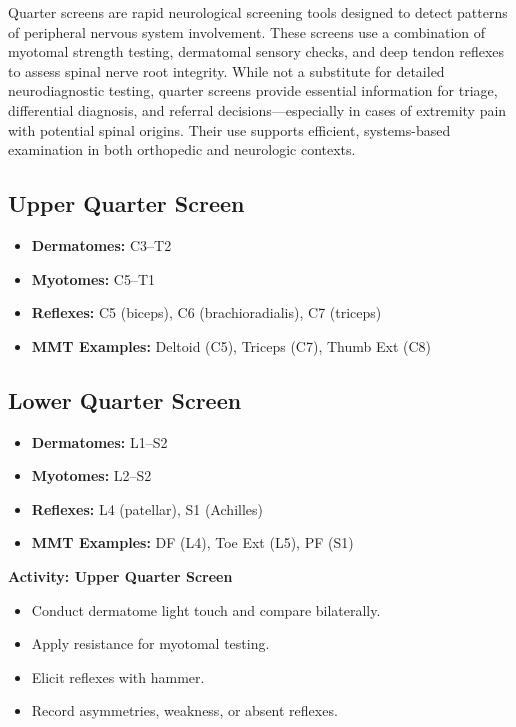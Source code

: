 Quarter screens are rapid neurological screening tools designed to detect patterns of peripheral nervous system involvement. These screens use a combination of myotomal strength testing, dermatomal sensory checks, and deep tendon reflexes to assess spinal nerve root integrity. While not a substitute for detailed neurodiagnostic testing, quarter screens provide essential information for triage, differential diagnosis, and referral decisions—especially in cases of extremity pain with potential spinal origins. Their use supports efficient, systems-based examination in both orthopedic and neurologic contexts.

\subsection*{Upper Quarter Screen}

\begin{itemize}
  \item \textbf{Dermatomes:} C3–T2
  \item \textbf{Myotomes:} C5–T1
  \item \textbf{Reflexes:} C5 (biceps), C6 (brachioradialis), C7 (triceps)
  \item \textbf{MMT Examples:} Deltoid (C5), Triceps (C7), Thumb Ext (C8)
\end{itemize}

\subsection*{Lower Quarter Screen}

\begin{itemize}
  \item \textbf{Dermatomes:} L1–S2
  \item \textbf{Myotomes:} L2–S2
  \item \textbf{Reflexes:} L4 (patellar), S1 (Achilles)
  \item \textbf{MMT Examples:} DF (L4), Toe Ext (L5), PF (S1)
\end{itemize}

\begin{labactivitybox}
\textbf{Activity: Upper Quarter Screen}

\begin{itemize}
  \item Conduct dermatome light touch and compare bilaterally.
  \item Apply resistance for myotomal testing.
  \item Elicit reflexes with hammer.
  \item Record asymmetries, weakness, or absent reflexes.
\end{itemize}
\end{labactivitybox}

